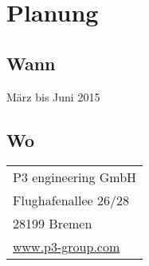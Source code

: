 \section{Planung}
\label{sec:planung}

  \subsection{Wann}
  \label{ssec:wann}
    März bis Juni 2015

  \subsection{Wo}
  \label{ssec:wo}
    \begin{tabular}{l}
      P3 engineering GmbH\\
      Flughafenallee 26/28\\
      28199 Bremen\\
      \href{www.p3-group.com}{www.p3-group.com}\\
    \end{tabular}

